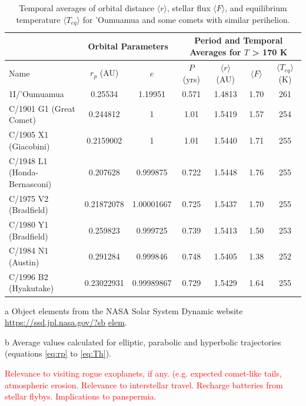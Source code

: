 \documentclass[a4paper,fleqn,usenatbib]{mnras}
\newcommand{\fix}{\textcolor{red}}
\begin{document}
\begin{table}
\begin{threeparttable}
\centering
\caption{Temporal averages of orbital distance $\langle r \rangle$, stellar flux $\langle F \rangle$, and equilibrium temperature $\langle T_{eq} \rangle$ for 'Oumuamua and some comets with similar perihelion.}
\begin{tabular}{ l c c | c c c c }
 \hline
 \hline
 & \multicolumn{2}{c}{Orbital Parameters\tnote{a}} & \multicolumn{4}{c}{Period and Temporal Averages for $T$ > 170 K\tnote{b}} \\
 \hline
 Name & $r_p$ (AU) & $e$ & $P$ (yrs) &
 	$\langle r \rangle$ (AU) & $\langle F \rangle$ & $\langle T_{eq} \rangle$ (K) \\ 
 \hline
 1I/'Oumuamua & 0.25534 & 1.19951 & 0.571 & 1.4813 & 1.70 & 261 \\
 C/1901 G1 (Great Comet) & 0.244812 & 1 & 1.01 & 1.5419 & 1.57 & 254 \\
 C/1905 X1 (Giacobini) & 0.2159002 & 1 & 1.01 & 1.5440 & 1.71 & 255 \\
C/1948 L1 (Honda-Bernasconi) & 0.207628 & 0.999875 & 0.722 & 1.5448 & 1.76 & 255 \\
 C/1975 V2 (Bradfield) & 0.21872078 & 1.00001667 & 0.725 & 1.5437 & 1.70 & 255 \\
 C/1980 Y1 (Bradfield) & 0.259823 & 0.999725 & 0.739 & 1.5413 & 1.50 & 253 \\
 C/1984 N1 (Austin) & 0.291284 & 0.999846 & 0.748 & 1.5405 & 1.38 & 252 \\
 C/1996 B2 (Hyakutake) & 0.23022931	& 0.99989867 & 0.729 & 1.5429 & 1.64 & 255 \\
 \hline
 \hline
\end{tabular}
\label{tab:escape}
	\begin{tablenotes}
	\small
\item[a]{Object elements from the NASA Solar System Dynamic website \href{https://ssd.jpl.nasa.gov/?sb$\_$elem}{https://ssd.jpl.nasa.gov/?sb$\_$elem}.}
\item[b]{Average values calculated for elliptic, parabolic and hyperbolic trajectories (equations \ref{eq:rp} to \ref{eq:Th}).}
	\end{tablenotes}
\end{threeparttable}
\end{table}

\fix{Relevance to visiting rogue exoplanets, if any. (e.g. expected comet-like tails, atmospheric erosion. Relevance to interstellar travel. Recharge batteries from stellar flybys. Implications to panspermia.}
\end{document}
